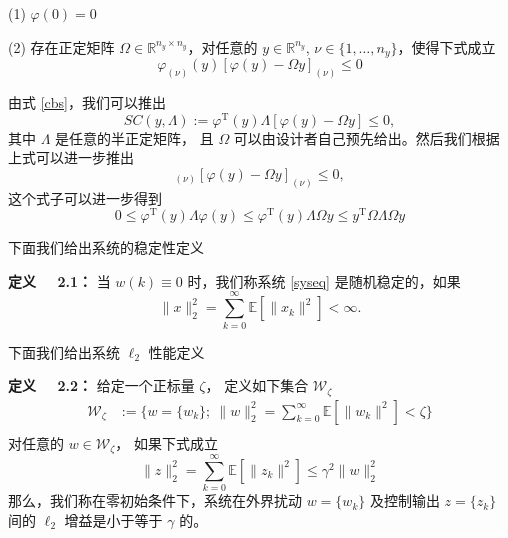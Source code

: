 		(1) $\varphi(0)=0$ 
		
		(2) 存在正定矩阵 $\varOmega \in\mathbb{R}^{n_y\times n_y}$，对任意的 $y\in\mathbb{R}^{n_y}$, $\nu \in\{1,\dots,n_y\}$，使得下式成立 
		\begin{equation}\label{cbs} 
		\varphi_{(\nu)}(y)[\varphi(y)-\varOmega y ]_{(\nu)}\leq 0
		\end{equation}
		
	由式 \eqref{cbs}，我们可以推出
	\begin{equation}\label{scieq}
	SC(y,\varLambda):= \varphi^{\mathrm{T}}(y)\varLambda[\varphi(y)-\varOmega y]\leq0,
	\end{equation}
	其中 $\varLambda$ 是任意的半正定矩阵， 且 $\varOmega$ 可以由设计者自己预先给出。然后我们根据上式可以进一步推出
	\begin{equation}
	[\varOmega y]_{(\nu)}[\varphi(y)-\varOmega y]_{(\nu)}\leq0,
	\end{equation}
	这个式子可以进一步得到
	\begin{equation}
	0\leq\varphi^{\mathrm{T}}(y)\varLambda\varphi(y) \leq \varphi^{\mathrm{T}}(y)\varLambda\varOmega y \leq y^{\mathrm{T}}\varOmega\varLambda\varOmega y
	\end{equation}
	
	下面我们给出系统的稳定性定义
	
	{\bf 定义 \ \ 2.1：} 
	当 $w(k)\equiv0$ 时，我们称系统 \eqref{syseq} 是随机稳定的，如果
	\begin{equation}
	\|x\|^2_2=\sum_{k=0}^{\infty}\mathbb{E}[\|x_k\|^2]<\infty.
	\end{equation} 
	
	下面我们给出系统 $\ell_2$ 性能定义
	
	{\bf 定义 \ \ 2.2：}
	给定一个正标量 $\zeta$， 定义如下集合 $\mathcal{W}_{\zeta} $ 	
	\begin{equation}
		\begin{split}
			\mathcal{W}_{\zeta}&:=\Big\{ w=\{w_k\}; \   \|w\|^2_2=\sum_{k=0}^{\infty}\mathbb{E}[\|w_k\|^{2}]<\zeta\Big\}\\
		\end{split}
	\end{equation}
	对任意的  $w\in\mathcal{W}_{\zeta}$， 如果下式成立
	\begin{equation}
		\|z\|^2_2=\sum_{k=0}^{\infty}\mathbb{E}\left[\|z_k\|^2\right] \leq \gamma^{2}\|w\|^2_2
	\end{equation}
	那么，我们称在零初始条件下，系统在外界扰动 $w=\{w_k\}$ 及控制输出 $z=\{z_k\}$ 间的 $\ell_2$ 增益是小于等于 $\gamma$ 的。
	
